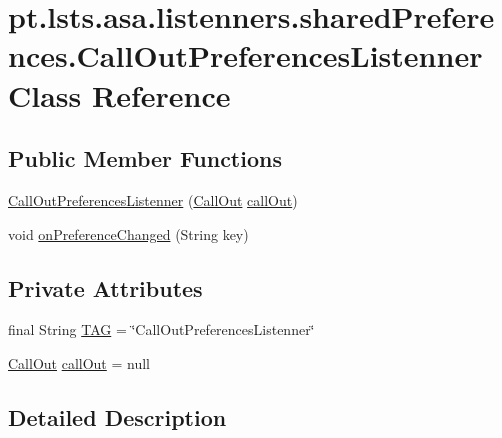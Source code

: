 \hypertarget{classpt_1_1lsts_1_1asa_1_1listenners_1_1sharedPreferences_1_1CallOutPreferencesListenner}{}\section{pt.\+lsts.\+asa.\+listenners.\+shared\+Preferences.\+Call\+Out\+Preferences\+Listenner Class Reference}
\label{classpt_1_1lsts_1_1asa_1_1listenners_1_1sharedPreferences_1_1CallOutPreferencesListenner}
\subsection*{Public Member Functions}
\begin{DoxyCompactItemize}
\item 
\hyperlink{classpt_1_1lsts_1_1asa_1_1listenners_1_1sharedPreferences_1_1CallOutPreferencesListenner_a09cfca7371a7e6cc844e1f0f2ecd57ef}{Call\+Out\+Preferences\+Listenner} (\hyperlink{classpt_1_1lsts_1_1asa_1_1feedback_1_1CallOut}{Call\+Out} \hyperlink{classpt_1_1lsts_1_1asa_1_1listenners_1_1sharedPreferences_1_1CallOutPreferencesListenner_a0d9dff55a478451b92662e84f60d6e1e}{call\+Out})
\item 
void \hyperlink{classpt_1_1lsts_1_1asa_1_1listenners_1_1sharedPreferences_1_1CallOutPreferencesListenner_aca15c85a16ca04bcbfcd2cda446d4272}{on\+Preference\+Changed} (String key)
\end{DoxyCompactItemize}
\subsection*{Private Attributes}
\begin{DoxyCompactItemize}
\item 
final String \hyperlink{classpt_1_1lsts_1_1asa_1_1listenners_1_1sharedPreferences_1_1CallOutPreferencesListenner_af3b9e5a9f28cdf18fdec5b181e0c6dc0}{T\+A\+G} = \char`\"{}Call\+Out\+Preferences\+Listenner\char`\"{}
\item 
\hyperlink{classpt_1_1lsts_1_1asa_1_1feedback_1_1CallOut}{Call\+Out} \hyperlink{classpt_1_1lsts_1_1asa_1_1listenners_1_1sharedPreferences_1_1CallOutPreferencesListenner_a0d9dff55a478451b92662e84f60d6e1e}{call\+Out} = null
\end{DoxyCompactItemize}


\subsection{Detailed Description}


